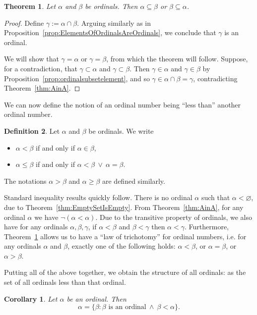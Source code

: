 \documentclass[a4paper,11pt]{article}
\theoremstyle{plain}
\newtheorem{thm}{Theorem}[subsection]
\newtheorem*{cor}{Corollary}
\theoremstyle{definition}
\newtheorem{defn}[thm]{Definition}
\theoremstyle{remark}
\begin{document}
\begin{thm}
\label{thm:ordinalsubsetofanother}
Let $\alpha$ and $\beta$ be ordinals. Then $\alpha \subseteq \beta$ or $\beta \subseteq \alpha$.
\end{thm}
\begin{proof}
Define $\gamma := \alpha \cap \beta$. Arguing similarly as in Proposition~\ref{prop:ElementsOfOrdinalsAreOrdinals}, we conclude that $\gamma$ is an ordinal.

We will show that $\gamma = \alpha$ or $\gamma = \beta$, from which the theorem will follow. Suppose, for a contradiction, that $\gamma \subset \alpha$ and $\gamma \subset \beta$. Then $\gamma \in \alpha$ and $\gamma\in\beta$ by Proposition~\ref{prop:ordinalsubsetelement}, and so $\gamma\in\alpha\cap\beta=\gamma$, contradicting Theorem~\ref{thm:AinA}.
\end{proof}

We can now define the notion of an ordinal number being ``less than'' another ordinal number.

\begin{defn}
\label{defn:inequalities}
Let $\alpha$ and $\beta$ be ordinals. We write
\begin{itemize}
\item $\alpha<\beta$ if and only if $\alpha\in\beta$,
\item $\alpha\leq\beta$ if and only if $\alpha<\beta\ \lor \ \alpha=\beta$.
\end{itemize}
\end{defn}
The notations $\alpha>\beta$ and $\alpha\geq\beta$ are defined similarly.

Standard inequality results quickly follow. There is no ordinal $\alpha$ such that $\alpha < \varnothing$, due to Theorem~\ref{thm:EmptySetIsEmpty}. From Theorem~\ref{thm:AinA}, for any ordinal $\alpha$ we have $\lnot(\alpha < \alpha)$. Due to the transitive property of ordinals, we also have for any ordinals $\alpha,\beta,\gamma$, if $\alpha<\beta$ and $\beta<\gamma$ then $\alpha<\gamma$. Furthermore, Theorem~\ref{thm:ordinalsubsetofanother} allows us to have a ``law of trichotomy'' for ordinal numbers, i.e. for any ordinals $\alpha$ and $\beta$, exactly one of the following holds: $\alpha < \beta$, or $\alpha = \beta$, or $\alpha > \beta$.

Putting all of the above together, we obtain the structure of all ordinals: as the set of all ordinals less than that ordinal.

\begin{cor}
Let $\alpha$ be an ordinal. Then
\[\alpha = \{\beta : \beta \text{ is an ordinal}\ \land \ \beta<\alpha\}.\]
\end{cor}
\end{document}
